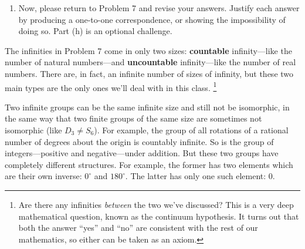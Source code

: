 \documentclass[../gatm.tex]{subfiles}
\begin{document}
\begin{enumerate}
\setcounter{enumi}{\value{inf_problem_i}}
\item Now, please return to Problem 7 and revise your answers. Justify each answer by producing a one-to-one correspondence, or showing the impossibility of doing so. Part (h) is an optional challenge.
\setcounter{inf_problem_i}{\value{enumi}}
\end{enumerate}

The infinities in Problem 7 come in only two sizes: \textbf{countable} infinity---like the number of natural numbers---and \textbf{uncountable} infinity---like the number of real numbers. There are, in fact, an infinite number of sizes of infinity, but these two main types are the only ones we'll deal with in this class. \footnote{Are there any infinities \textit{between} the two we’ve discussed? This is a very deep mathematical question, known as the continuum hypothesis. It turns out that both the answer ``yes'' and ``no'' are consistent with the rest of our mathematics, so either can be taken as an axiom.}

Two infinite groups can be the same infinite size and still not be isomorphic, in the same way that two finite groups of the same size are sometimes not isomorphic (like $D_3\neq S_6$). For example, the group of all rotations of a rational number of degrees about the origin is countably infinite. So is the group of integers---positive and negative---under addition. But these two groups have completely different structures. For example, the former has two elements which are their own inverse: $0^\circ$ and $180^\circ$. The latter has only one such element: $0$.
\end{document}
